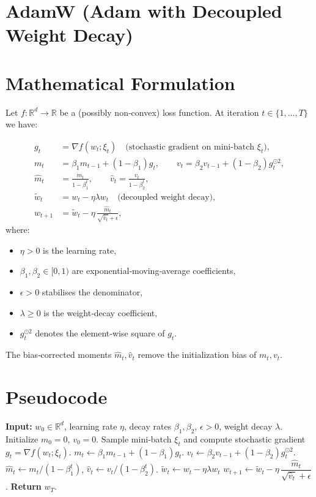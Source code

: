 \documentclass[11pt]{article}
\newcommand{\R}{\mathbb{R}}
\begin{document}
\section*{AdamW (Adam with Decoupled Weight Decay)}

\section*{Mathematical Formulation}
Let $f:\R^{d}\rightarrow\R$ be a (possibly non‑convex) loss function.  
At iteration $t\in\{1,\dots,T\}$ we have:

\begin{align}
g_{t}&=\nabla f(w_{t};\xi_{t})\quad\text{(stochastic gradient on mini‑batch }\xi_{t}),\\[4pt]
m_{t}&=\beta_{1}m_{t-1}+(1-\beta_{1})g_{t},\qquad 
v_{t}= \beta_{2}v_{t-1}+(1-\beta_{2})g_{t}^{\odot 2},\\[4pt]
\hat m_{t}&=\frac{m_{t}}{1-\beta_{1}^{t}},\qquad 
\hat v_{t}= \frac{v_{t}}{1-\beta_{2}^{t}},\\[4pt]
\tilde w_{t}&=w_{t}-\eta\lambda w_{t}\quad\text{(decoupled weight decay)},\\[4pt]
w_{t+1}&=\tilde w_{t}-\eta\,
\frac{\hat m_{t}}{\sqrt{\hat v_{t}}+\epsilon},
\end{align}
where:
\begin{itemize}
\item $\eta>0$ is the learning rate,
\item $\beta_{1},\beta_{2}\in[0,1)$ are exponential‑moving‑average coefficients,
\item $\epsilon>0$ stabilises the denominator,
\item $\lambda\ge 0$ is the weight‑decay coefficient,
\item $g_{t}^{\odot 2}$ denotes the element‑wise square of $g_{t}$.
\end{itemize}
The bias‑corrected moments $\hat m_{t},\hat v_{t}$ remove the initialization bias of $m_{t},v_{t}$.

\section*{Pseudocode}
\begin{algorithm}[H]
\caption{AdamW}
\begin{algorithmic}[1]
\State \textbf{Input:} $w_{0}\in\R^{d}$, learning rate $\eta$, decay rates $\beta_{1},\beta_{2}$,
$\epsilon>0$, weight decay $\lambda$.
\State Initialize $m_{0}=0$, $v_{0}=0$.
    \State Sample mini‑batch $\xi_{t}$ and compute stochastic gradient $g_{t}=\nabla f(w_{t};\xi_{t})$.
    \State $m_{t}\gets\beta_{1}m_{t-1}+(1-\beta_{1})g_{t}$.
    \State $v_{t}\gets\beta_{2}v_{t-1}+(1-\beta_{2})g_{t}^{\odot 2}$.
    \State $\hat m_{t}\gets m_{t}/(1-\beta_{1}^{t})$, $\hat v_{t}\gets v_{t}/(1-\beta_{2}^{t})$.
    \State $\tilde w_{t}\gets w_{t}-\eta\lambda w_{t}$ \hfill{}
    \State $w_{t+1}\gets\tilde w_{t}-\eta\,\dfrac{\hat m_{t}}{\sqrt{\hat v_{t}}+\epsilon}$.
\EndFor
\State \textbf{Return} $w_{T}$.
\end{algorithmic}
\end{algorithm}
\end{document}
